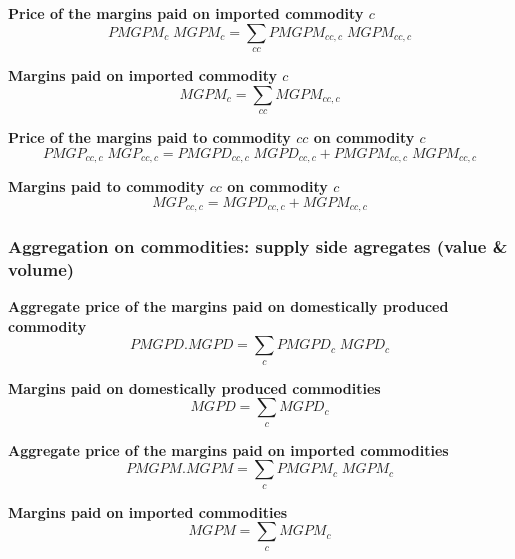\documentclass[12pt]{article}
\numberwithin{equation}{section}
\begin{document}
\noindent\textbf{Price of the margins paid on imported commodity $c$} \\
\begin{dmath}
PMGPM_{c} \; MGPM_{c} = \sum_{cc} PMGPM_{cc, c} \; MGPM_{cc, c}
\end{dmath}

\noindent\textbf{Margins paid on imported commodity $c$} \\
\begin{dmath}
MGPM_{c} = \sum_{cc} MGPM_{cc, c}
\end{dmath}

\noindent\textbf{Price of the margins paid to commodity $cc$ on commodity $c$} \\
\begin{dmath}
PMGP_{cc, c} \; MGP_{cc, c} = PMGPD_{cc, c} \; MGPD_{cc, c} + PMGPM_{cc, c} \; MGPM_{cc, c}
\end{dmath}

\noindent\textbf{Margins paid to commodity $cc$ on commodity $c$} \\
\begin{dmath}
MGP_{cc, c} = MGPD_{cc, c} + MGPM_{cc, c}
\end{dmath}




\subsubsection{Aggregation on commodities: supply side agregates (value \& volume)}



\noindent\textbf{Aggregate price of the margins paid on domestically produced commodity} \\
\begin{dmath}
PMGPD . MGPD = \sum_{c} PMGPD_{c} \; MGPD_{c}
\end{dmath}

\noindent\textbf{Margins paid on domestically produced commodities} \\
\begin{dmath}
MGPD = \sum_{c} MGPD_{c}
\end{dmath}

\noindent\textbf{Aggregate price of the margins paid on imported commodities} \\
\begin{dmath}
PMGPM . MGPM = \sum_{c} PMGPM_{c} \; MGPM_{c}
\end{dmath}

\noindent\textbf{Margins paid on imported commodities} \\
\begin{dmath}
MGPM = \sum_{c} MGPM_{c}
\end{dmath}
\end{document}
